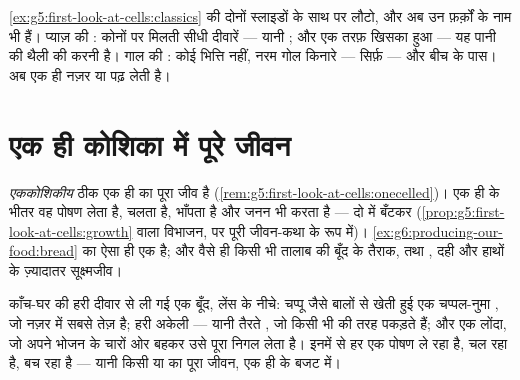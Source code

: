 \begin{example}\label{ex:g6:cell-unit-of-life:slides}
\cref{ex:g5:first-look-at-cells:classics} की दोनों स्लाइडों के साथ
 पर लौटो, और अब उन फ़र्क़ों के नाम भी हैं। प्याज़ की :
कोनों पर मिलती सीधी दीवारें --- यानी ; और एक तरफ़ खिसका
हुआ  --- यह पानी की थैली की करनी है। गाल की : कोई
भित्ति नहीं, नरम गोल किनारे --- सिर्फ़  --- और  बीच के
पास। अब एक ही नज़र  या  पढ़ लेती है।
\end{example}

\section{एक ही कोशिका में पूरे जीवन}

\begin{definition}[एककोशिकीय सजीव]\label{def:g6:cell-unit-of-life:unicellular}
\emph{एककोशिकीय}  ठीक एक ही  का पूरा जीव है
(\cref{rem:g5:first-look-at-cells:onecelled})। एक ही  के भीतर वह
पोषण लेता है, चलता है, भाँपता है और जनन भी करता है --- दो में बँटकर
(\cref{prop:g5:first-look-at-cells:growth} वाला विभाजन, पर पूरी
जीवन-कथा के रूप में)। \cref{ex:g6:producing-our-food:bread} का 
ऐसा ही एक है; और वैसे ही किसी भी तालाब की बूँद के तैराक, तथा ,
दही और हाथों के ज़्यादातर सूक्ष्मजीव।
\end{definition}

\begin{example}[तालाब के पानी की एक बूँद, घुमाकर देखी हुई]\label{ex:g6:cell-unit-of-life:drop}
काँच-घर की हरी दीवार से ली गई एक बूँद, लेंस के नीचे: चप्पू जैसे बालों
से खेती हुई एक चप्पल-नुमा , जो नज़र में सबसे तेज़ है; हरी अकेली
 --- यानी तैरते , जो किसी भी  की तरह  पकड़ते
हैं; और एक लोंदा, जो अपने भोजन के चारों ओर बहकर उसे पूरा निगल लेता है।
इनमें से हर एक पोषण ले रहा है, चल रहा है, बच रहा है --- यानी किसी
 या  का पूरा जीवन, एक ही  के बजट में।
\end{example}

